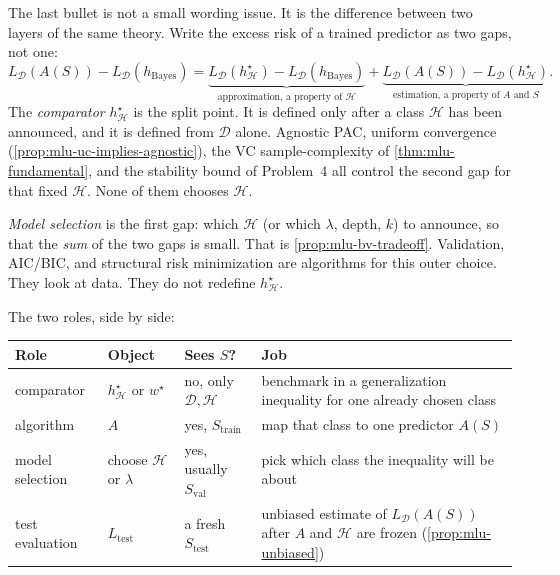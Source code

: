 \begin{remark}
\label{rem:mlu-pipeline}
The last bullet is not a small wording issue. It is the difference between two layers of the same theory. Write the excess risk of a trained predictor as two gaps, not one:
\[
L_{\mathcal{D}}(A(S))-L_{\mathcal{D}}(h_{\mathrm{Bayes}})
=
\underbrace{L_{\mathcal{D}}(h^\star_{\mathcal{H}})-L_{\mathcal{D}}(h_{\mathrm{Bayes}})}_{\text{approximation, a property of $\mathcal{H}$}}
+
\underbrace{L_{\mathcal{D}}(A(S))-L_{\mathcal{D}}(h^\star_{\mathcal{H}})}_{\text{estimation, a property of $A$ and $S$}}.
\]
The \emph{comparator} $h^\star_{\mathcal{H}}$ is the split point. It is defined only after a class $\mathcal{H}$ has been announced, and it is defined from $\mathcal{D}$ alone. Agnostic PAC, uniform convergence (\cref{prop:mlu-uc-implies-agnostic}), the VC sample-complexity of \cref{thm:mlu-fundamental}, and the stability bound of Problem~4 all control the second gap for that fixed $\mathcal{H}$. None of them chooses $\mathcal{H}$.

\emph{Model selection} is the first gap: which $\mathcal{H}$ (or which $\lambda$, depth, $k$) to announce, so that the \emph{sum} of the two gaps is small. That is \cref{prop:mlu-bv-tradeoff}. Validation, AIC/BIC, and structural risk minimization are algorithms for this outer choice. They look at data. They do not redefine $h^\star_{\mathcal{H}}$.

The two roles, side by side:
\begin{center}
\begin{tabular}{|l|l|l|p{}|}
\hline
\textbf{Role} & \textbf{Object} & \textbf{Sees $S$?} & \textbf{Job} \\ \hline
comparator & $h^\star_{\mathcal{H}}$ or $w^\star$ & no, only $\mathcal{D},\mathcal{H}$ & benchmark in a generalization inequality for one already chosen class \\ \hline
algorithm & $A$ & yes, $S_{\mathrm{train}}$ & map that class to one predictor $A(S)$ \\ \hline
model selection & choose $\mathcal{H}$ or $\lambda$ & yes, usually $S_{\mathrm{val}}$ & pick which class the inequality will be about \\ \hline
test evaluation & $L_{\mathrm{test}}$ & a fresh $S_{\mathrm{test}}$ & unbiased estimate of $L_{\mathcal{D}}(A(S))$ after $A$ and $\mathcal{H}$ are frozen (\cref{prop:mlu-unbiased}) \\ \hline
\end{tabular}
\end{center}


\end{remark}
